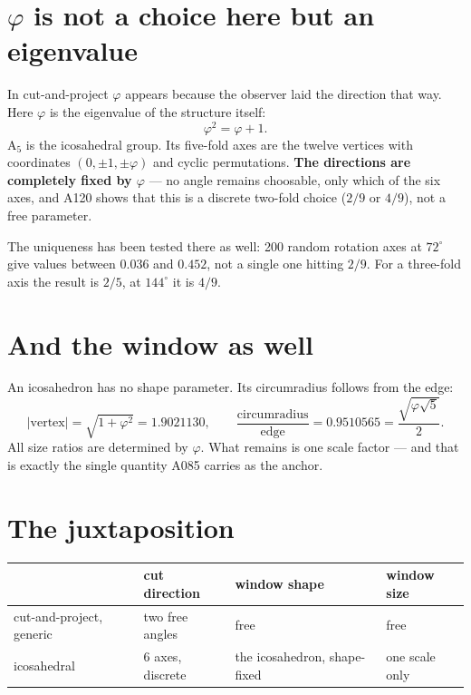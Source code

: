 \documentclass[11pt]{report}
\begin{document}
\section{\texorpdfstring{$\varphi$}{phi} is not a choice here but an
eigenvalue}

In cut-and-project $\varphi$ appears because the observer laid the
direction that way. Here $\varphi$ is the eigenvalue of the structure
itself:
\[
  \varphi^2 = \varphi + 1 .
\]
A$_5$ is the icosahedral group. Its five-fold axes are the twelve
vertices with coordinates $(0, \pm1, \pm\varphi)$ and cyclic
permutations. \textbf{The directions are completely fixed by
$\varphi$} --- no angle remains choosable, only which of the six axes,
and A120 shows that this is a discrete two-fold choice ($2/9$ or
$4/9$), not a free parameter.

The uniqueness has been tested there as well: 200 random rotation axes
at $72^\circ$ give values between $0.036$ and $0.452$, not a single one
hitting $2/9$. For a three-fold axis the result is $2/5$, at $144^\circ$
it is $4/9$.

\section{And the window as well}

An icosahedron has no shape parameter. Its circumradius follows from
the edge:
\[
  |\text{vertex}| = \sqrt{1 + \varphi^2} = 1.9021130, \qquad
  \frac{\text{circumradius}}{\text{edge}} = 0.9510565
  = \frac{\sqrt{\varphi\sqrt5}}{2}.
\]
All size ratios are determined by $\varphi$. What remains is one scale
factor --- and that is exactly the single quantity A085 carries as the
anchor.

\section{The juxtaposition}

\begin{center}
\begin{tabular}{llll}
\toprule
 & cut direction & window shape & window size \\
\midrule
cut-and-project, generic & two free angles & free & free \\
icosahedral & 6 axes, discrete & the icosahedron, shape-fixed & one scale only \\
\bottomrule
\end{tabular}
\end{center}
\end{document}
